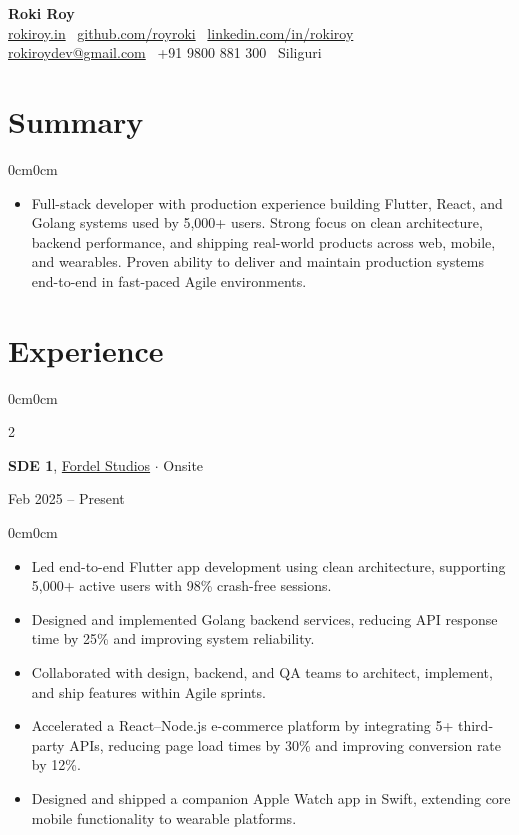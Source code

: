 \documentclass[10pt, letterpaper]{article}
\newenvironment{highlights}{
    \begin{itemize}[
        topsep=1pt,
        itemsep=0.5pt,
        parsep=0pt,
        partopsep=0pt,
        leftmargin=11pt
    ]
}{
    \end{itemize}
}
\newenvironment{onecolentry}{
    \begin{adjustwidth}{0cm}{0cm}
}{
    \end{adjustwidth}
}
\newenvironment{twocolentry}[2]{
    \onecolentry
    \setcolumnwidth{\fill,4.1cm}
    \begin{paracol}{2}
    #1
    \switchcolumn
    \raggedleft #2
}{
    \end{paracol}
    \endonecolentry
}
\begin{document}
\begin{center}
    {\fontsize{23pt}{23pt}\selectfont \textbf{Roki Roy}} \\[4pt]
    \href{https://rokiroy.in}{rokiroy.in} \textbullet\ 
    \href{https://github.com/royroki}{github.com/royroki} \textbullet\ 
    \href{https://linkedin.com/in/rokiroy}{linkedin.com/in/rokiroy} \\[4pt]
    \href{mailto:rokiroydev@gmail.com}{rokiroydev@gmail.com} \textbullet\ 
    +91 9800 881 300 \textbullet\ Siliguri
\end{center}

\vspace{6pt}

\section{Summary}
\begin{onecolentry}
\begin{highlights}
\item Full-stack developer with production experience building Flutter, React, and Golang systems used by 5,000+ users. Strong focus on clean architecture, backend performance, and shipping real-world products across web, mobile, and wearables. Proven ability to deliver and maintain production systems end-to-end in fast-paced Agile environments.
\end{highlights}
\end{onecolentry}

\section{Experience}

\begin{twocolentry}{
\textbf{SDE 1}, \href{https://fordelstudios.com}{Fordel Studios} $\cdot$ Onsite
}{
Feb 2025 -- Present
}
\end{twocolentry}

\begin{onecolentry}
\begin{highlights}
\item Led end-to-end Flutter app development using clean architecture, supporting 5,000+ active users with 98\% crash-free sessions.
\item Designed and implemented Golang backend services, reducing API response time by 25\% and improving system reliability.
\item Collaborated with design, backend, and QA teams to architect, implement, and ship features within Agile sprints.
\item Accelerated a React--Node.js e-commerce platform by integrating 5+ third-party APIs, reducing page load times by 30\% and improving conversion rate by 12\%.
\item Designed and shipped a companion Apple Watch app in Swift, extending core mobile functionality to wearable platforms.
\end{highlights}
\end{onecolentry}
\end{document}
